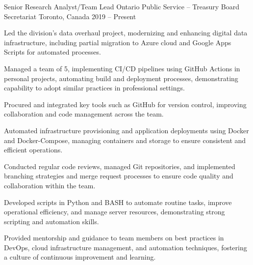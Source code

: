 
\begin{cventries}

\cventry%
	{Senior Research Analyst/Team Lead}
	{Ontario Public Service -- Treasury Board Secretariat}
	{Toronto, Canada}
	{2019 -- Present}
	{
		\begin{cvitems}
			\item Led the division's data overhaul project, modernizing and enhancing digital data infrastructure, including partial migration to Azure cloud and Google Apps Scripts for automated processes.
			\item Managed a team of 5, implementing CI/CD pipelines using GitHub Actions in personal projects, automating build and deployment processes, demonstrating capability to adopt similar practices in professional settings.
			\item Procured and integrated key tools such as GitHub for version control, improving collaboration and code management across the team.
			\item Automated infrastructure provisioning and application deployments using Docker and Docker-Compose, managing containers and storage to ensure consistent and efficient operations.
			\item Conducted regular code reviews, managed Git repositories, and implemented branching strategies and merge request processes to ensure code quality and collaboration within the team.
			\item Developed scripts in Python and BASH to automate routine tasks, improve operational efficiency, and manage server resources, demonstrating strong scripting and automation skills.
			\item Provided mentorship and guidance to team members on best practices in DevOps, cloud infrastructure management, and automation techniques, fostering a culture of continuous improvement and learning.
		\end{cvitems}
	}


\end{cventries}
